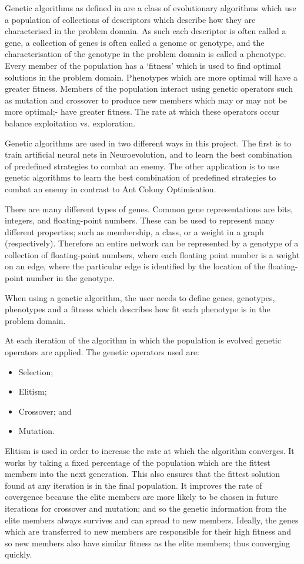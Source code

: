 Genetic algorithms as defined in \cite{ga} are a class of evolutionary algorithms which use a population of collections of descriptors which describe how they are characterised in the problem domain. As such each descriptor is often called a gene, a collection of genes is often called a genome or genotype, and the characterisation of the genotype in the problem domain is called a phenotype. Every member of the population has a `fitness' which is used to find optimal solutions in the problem domain. Phenotypes which are more optimal will have a greater fitness. Members of the population interact using genetic operators such as mutation and crossover to produce new members which may or may not be more optimal;- have greater fitness. The rate at which these operators occur balance exploitation vs. exploration.

Genetic algorithms are used in two different ways in this project. The first is to train artificial neural nets in Neuroevolution, and to learn the best combination of predefined strategies to combat an enemy. The other application is to use genetic algorithms to learn the best combination of predefined strategies to combat an enemy in contrast to Ant Colony Optimisation.

There are many different types of genes. Common gene representations are bits, integers, and floating-point numbers. These can be used to represent many different properties; such as membership, a class, or a weight in a graph (respectively). Therefore an entire network can be represented by a genotype of a collection of floating-point numbers, where each floating point number is a weight on an edge, where the particular edge is identified by the location of the floating-point number in the genotype.


When using a genetic algorithm, the user needs to define genes, genotypes, phenotypes and a fitness which describes how fit each phenotype is in the problem domain. 



At each iteration of the algorithm in which the population is evolved genetic operators are applied. The genetic operators used are:
\begin{itemize}
\item Selection;
\item Elitism;
\item Crossover; and 
\item Mutation.
\end{itemize}

Elitism is used in order to increase the rate at which the algorithm converges. It works by taking a fixed percentage of the population which are the fittest members into the next generation. This also ensures that the fittest solution found at any iteration is in the final population. It improves the rate of covergence because the elite members are more likely to be chosen in future iterations for crossover and mutation; and so the genetic information from the elite members always survives and can spread to new members. Ideally, the genes which are transferred to new members are responsible for their high fitness and so new members also have similar fitness as the elite members; thus converging quickly.

